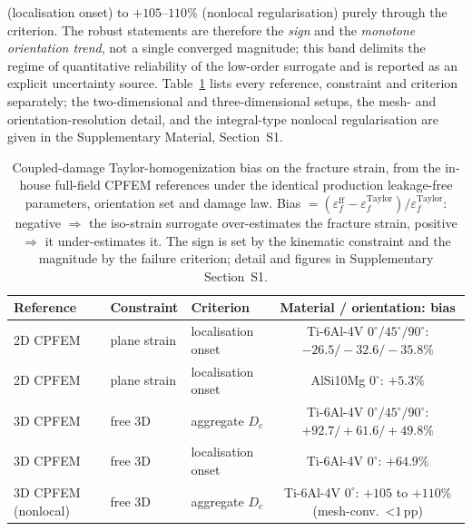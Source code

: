 \documentclass[twocolumn]{sagej}
\begin{document}
(localisation onset) to $+105$--$110\%$ (nonlocal regularisation) purely through the criterion. The robust statements are therefore the \emph{sign} and the \emph{monotone orientation trend}, not a single converged magnitude; this band delimits the regime of quantitative reliability of the low-order surrogate and is reported as an explicit uncertainty source. Table~\ref{tab:taylor_bias_conditions} lists every reference, constraint and criterion separately; the two-dimensional and three-dimensional setups, the mesh- and orientation-resolution detail, and the integral-type nonlocal regularisation are given in the Supplementary Material, Section~S1.

\begin{table}[htbp]
\centering
\caption{Coupled-damage Taylor-homogenization bias on the fracture strain, from the in-house full-field CPFEM references under the identical production leakage-free parameters, orientation set and damage law. Bias $=(\varepsilon_f^{\mathrm{ff}}-\varepsilon_f^{\mathrm{Taylor}})/\varepsilon_f^{\mathrm{Taylor}}$: negative $\Rightarrow$ the iso-strain surrogate over-estimates the fracture strain, positive $\Rightarrow$ it under-estimates it. The sign is set by the kinematic constraint and the magnitude by the failure criterion; detail and figures in Supplementary Section~S1.}
\label{tab:taylor_bias_conditions}
\footnotesize
\setlength{\tabcolsep}{4pt}
\begin{tabular}{lllc}
\toprule
\textbf{Reference} & \textbf{Constraint} & \textbf{Criterion} & \textbf{Material / orientation: bias} \\
\midrule
2D CPFEM & plane strain & localisation onset & Ti-6Al-4V $0^\circ/45^\circ/90^\circ$: $-26.5/-32.6/-35.8\%$ \\
2D CPFEM & plane strain & localisation onset & AlSi10Mg $0^\circ$: $+5.3\%$ \\
3D CPFEM & free 3D & aggregate $D_c$ & Ti-6Al-4V $0^\circ/45^\circ/90^\circ$: $+92.7/+61.6/+49.8\%$ \\
3D CPFEM & free 3D & localisation onset & Ti-6Al-4V $0^\circ$: $+64.9\%$ \\
3D CPFEM (nonlocal) & free 3D & aggregate $D_c$ & Ti-6Al-4V $0^\circ$: $+105$ to $+110\%$ (mesh-conv.~<$1$\,pp) \\
\bottomrule
\end{tabular}
\end{table}
\end{document}
